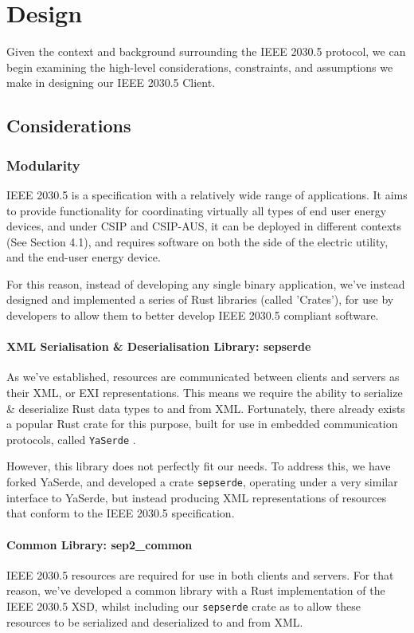 \chapter{Design}\label{ch:design}
Given the context and background surrounding the IEEE 2030.5 protocol, we can begin examining the high-level considerations, constraints, and assumptions we make in designing our IEEE 2030.5 Client.

\section{Considerations}

\subsection{Modularity}
IEEE 2030.5 is a specification with a relatively wide range of applications. It aims to provide functionality for coordinating virtually all types of end user energy devices, and under CSIP and CSIP-AUS, it can be deployed in different contexts (See Section 4.1), and requires software on both the side of the electric utility, and the end-user energy device.

For this reason, instead of developing any single binary application, we've instead designed and implemented a series of Rust libraries (called 'Crates'), for use by developers to allow them to better develop IEEE 2030.5 compliant software.

\subsubsection{XML Serialisation \& Deserialisation Library: \- sepserde}
As we've established, resources are communicated between clients and servers as their XML, or EXI representations. This means we require the ability to serialize \& deserialize Rust data types to and from XML.
Fortunately, there already exists a popular Rust crate for this purpose, built for use in embedded communication protocols, called \texttt{YaSerde} \cite[]{YaSerde}.

However, this library does not perfectly fit our needs. To address this, we have forked YaSerde, and developed a crate \texttt{sepserde}, operating under a very similar interface to YaSerde, but instead producing XML representations of resources that conform to the IEEE 2030.5 specification.

\subsubsection{Common Library: \- sep2\_common}
IEEE 2030.5 resources are required for use in both clients and servers. For that reason, we've developed a common library with a Rust implementation of the IEEE 2030.5 XSD, whilst including our \texttt{sepserde} crate as to allow these resources to be serialized and deserialized to and from XML.

